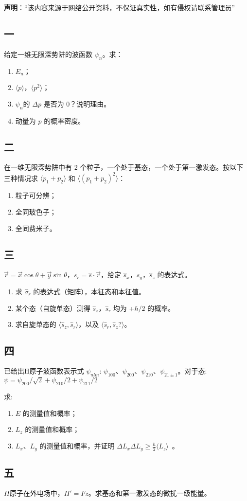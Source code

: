 
\textbf{声明}：“该内容来源于网络公开资料，不保证真实性，如有侵权请联系管理员”

\subsection{一}
给定一维无限深势阱的波函数 $\psi_n$。求：
\begin{enumerate}
    \item $E_n$；
    \item $\langle p \rangle$，$\langle p^2 \rangle$；
    \item $\psi_n$的 $\Delta p$ 是否为 0？说明理由。
    \item 动量为 $p$ 的概率密度。
\end{enumerate}
\subsection{二}
在一维无限深势阱中有 2 个粒子，一个处于基态，一个处于第一激发态。按以下三种情况求 $\langle p_1 + p_2 \rangle$ 和 $\langle (p_1 + p_2)^2 \rangle$：
\begin{enumerate}
    \item 粒子可分辨；
    \item 全同玻色子；
    \item 全同费米子。
\end{enumerate}
\subsection{三}
$\vec{r} = \vec{x} \cos \theta + \vec{y} \sin \theta$，$\hat s_r = \hat{s} \cdot \vec{r}$，给定 $\hat s_x$，$\hat s_y$，$\hat s_z$ 的表达式。
\begin{enumerate}
    \item 求 $ \hat\sigma_r$ 的表达式（矩阵），本征态和本征值。
    \item 某个态（自旋单态）测得 $\hat s_z$，$\hat s_r$ 均为 +$\hbar/2$ 的概率。
    \item 求自旋单态的 $\langle \hat s_z ,\hat s_r \rangle$，以及 $\langle \hat s_r ,\hat s_z ?\rangle$。
\end{enumerate}
\subsection{四}
已给出H原子波函数表示式 $\psi_{nlm}$: $\psi_{100}$、$\psi_{200}$、$\psi_{210}$、$\psi_{21\pm 1}$。对于态:
$\psi = \psi_{200}/\sqrt{2} + \psi_{210}/{2} +\psi_{211}/{2}$

求:
\begin{enumerate}
    \item $E$ 的测量值和概率；
    \item $L_z$ 的测量值和概率；
    \item $L_x$、$L_y$ 的测量值和概率，并证明 $\Delta L_x \Delta L_y \geq \frac{\hbar}{2} \langle L_z \rangle$~。
\end{enumerate}
\subsection{五}
$H$原子在外电场中，$H' = Fz$。求基态和第一激发态的微扰一级能量。